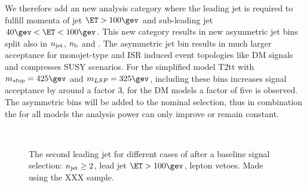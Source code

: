 We therefore add an new analysis category where the leading jet is required to fulfill 
momenta of jet $\ET>100\gev$ and sub-leading jet $40\gev<\ET<100\gev$. This new category 
results in new asymmetric jet bins split also in $n_{\text{jet}}$, $n_{\text{b}}$ and \HT. The asymmetric jet bin
results in much larger acceptance for monojet-type and ISR induced event topologies like DM signals
and compresses SUSY scenarios. 
For the simplified model T2tt with $m_{stop}=425\gev$ and $m_{LSP}=325\gev$, 
including these bins increases signal acceptance by around a factor 3, for the DM models a factor of five is observed.
The asymmetric bins will be added to the nominal selection, thus in combination the for all models the analysis power can only improve or remain constant.
\begin{figure}[h!]
  \centering
  ~~
  \\
  \caption{\label{fig:asymMotivation} The second leading jet \PT for different
  cases of \HT after a baseline signal selection: $n_{\text{jet}}\geq2$, lead jet
  $\ET>100\gev$, lepton vetoes. Made using the XXX sample.}
\end{figure}

